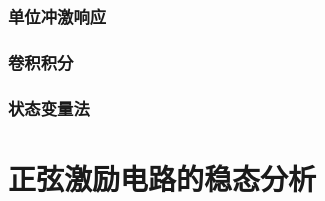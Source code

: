 \documentclass[UTF8]{report}
\theoremstyle{MyLineTheoremStyle} %
\theoremstyle{MyBlockTheoremStyle} %
\theoremstyle{MySubsubsectionStyle} %
\begin{document}
\subsection{单位冲激响应}
\subsection{卷积积分}
\subsection{状态变量法}

\chapter{正弦激励电路的稳态分析}\thispagestyle{fancy}
\end{document}
